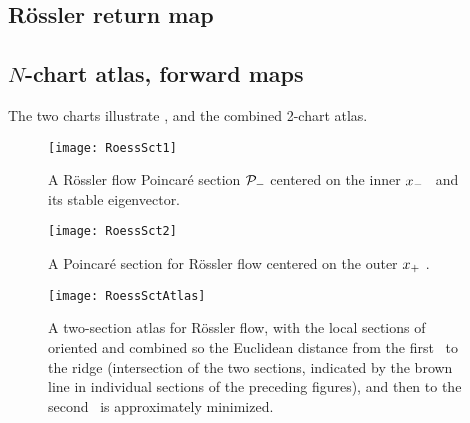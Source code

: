 \subsection{R\"ossler return map}
\subsection{$N$-chart atlas, forward maps}

    \ifdraft\color{blue}


The two charts
 illustrate \poincBord,
and  the combined 2-chart atlas.

\begin{figure}%
\begin{center}
  \texttt{[image: RoessSct1]}
\end{center}
  \caption{\label{fig:RoessSct1}
  A R\"ossler flow Poincar\'e section ${\cal P}_{-}$ centered on the inner
  {\eqv} $x_{-}$ \template\ and its stable eigenvector.
}
\end{figure}

\begin{figure}%
\begin{center}
  \texttt{[image: RoessSct2]}
\end{center}
  \caption[R\"ossler section, outer {\eqv}]{
  A Poincar\'e section for R\"ossler flow
      centered on the
      outer
  {\eqv} $x_{+}$ \template.
  } \label{fig:RoessSct2}
\end{figure}

\begin{figure}%
\begin{center}
  \texttt{[image: RoessSctAtlas]}
\end{center}
  \caption{
  A two-section atlas for R\"ossler flow, with the local sections of
   oriented and combined so the
  Euclidean distance from the first \template\ to the ridge (intersection
  of the two sections, indicated by the brown line in individual sections
  of the preceding figures), and then to the second \template\ is
  approximately minimized.
  } \label{fig:RoessSctAtlas}
\end{figure}

